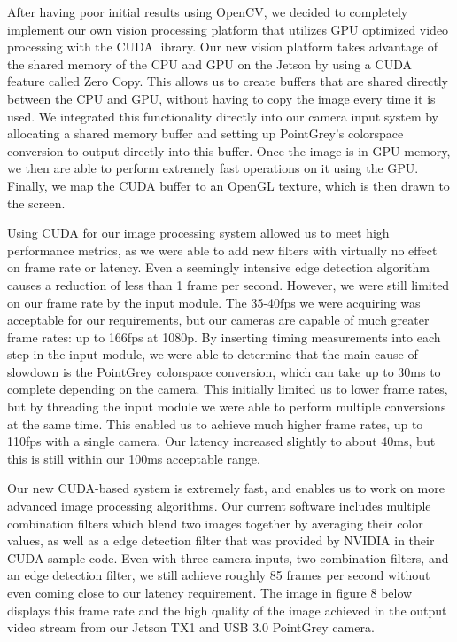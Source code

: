 \par
After having poor initial results using OpenCV, we decided to completely implement our own vision processing platform that utilizes GPU optimized video processing with the CUDA library. Our new vision platform takes advantage of the shared memory of the CPU and GPU on the Jetson by using a CUDA feature called Zero Copy. This allows us to create buffers that are shared directly between the CPU and GPU, without having to copy the image every time it is used. We integrated this functionality directly into our camera input system by allocating a shared memory buffer and setting up PointGrey's colorspace conversion to output directly into this buffer. Once the image is in GPU memory, we then are able to perform extremely fast operations on it using the GPU. Finally, we map the CUDA buffer to an OpenGL texture, which is then drawn to the screen.
\par
Using CUDA for our image processing system allowed us to meet high performance metrics, as we were able to add new filters with virtually no effect on frame rate or latency. Even a seemingly intensive edge detection algorithm causes a reduction of less than 1 frame per second. However, we were still limited on our frame rate by the input module. The 35-40fps we were acquiring was acceptable for our requirements, but our cameras are capable of much greater frame rates: up to 166fps at 1080p. By inserting timing measurements into each step in the input module, we were able to determine that the main cause of slowdown is the PointGrey colorspace conversion, which can take up to 30ms to complete depending on the camera. This initially limited us to lower frame rates, but by threading the input module we were able to perform multiple conversions at the same time. This enabled us to achieve much higher frame rates, up to 110fps with a single camera. Our latency increased slightly to about 40ms, but this is still within our 100ms acceptable range.
\par
Our new CUDA-based system is extremely fast, and enables us to work on more advanced image processing algorithms. Our current software includes multiple combination filters which blend two images together by averaging their color values, as well as a edge detection filter that was provided by NVIDIA in their CUDA sample code. Even with three camera inputs, two combination filters, and an edge detection filter, we still achieve roughly 85 frames per second without even coming close to our latency requirement. The image in figure 8 below displays this frame rate and the high quality of the image achieved in the output video stream from our Jetson TX1 and USB 3.0 PointGrey camera.
